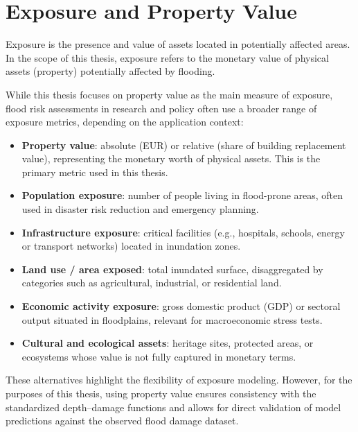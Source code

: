 \section{Exposure and Property Value}
\label{sec:exposure-and-property-value}
Exposure is the presence and value of assets located in potentially affected areas. In the scope of this thesis, exposure refers to the monetary value of physical assets (property) potentially affected by flooding.

While this thesis focuses on property value as the main measure of exposure, flood risk assessments in research and policy often use a broader range of exposure metrics, depending on the application context:

\begin{itemize}
    \item \textbf{Property value}: absolute (EUR) or relative (share of building replacement value), representing the monetary worth of physical assets. This is the primary metric used in this thesis.
    \item \textbf{Population exposure}: number of people living in flood-prone areas, often used in disaster risk reduction and emergency planning.
    \item \textbf{Infrastructure exposure}: critical facilities (e.g., hospitals, schools, energy or transport networks) located in inundation zones.
    \item \textbf{Land use / area exposed}: total inundated surface, disaggregated by categories such as agricultural, industrial, or residential land.
    \item \textbf{Economic activity exposure}: gross domestic product (GDP) or sectoral output situated in floodplains, relevant for macroeconomic stress tests.
    \item \textbf{Cultural and ecological assets}: heritage sites, protected areas, or ecosystems whose value is not fully captured in monetary terms.
\end{itemize}

These alternatives highlight the flexibility of exposure modeling. However, for the purposes of this thesis, using property value ensures consistency with the standardized depth--damage functions and allows for direct validation of model predictions against the observed flood damage dataset.


